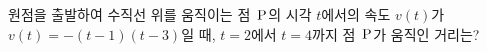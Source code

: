 원점을 출발하여 수직선 위를 움직이는 점~$\mathrm{P}$의 시각 $t$에서의 속도 $v(t)$가 $v(t)=-(t-1)(t-3)$일 때, $t=2$에서 $t=4$까지 점~$\mathrm{P}$가 움직인 거리는?
